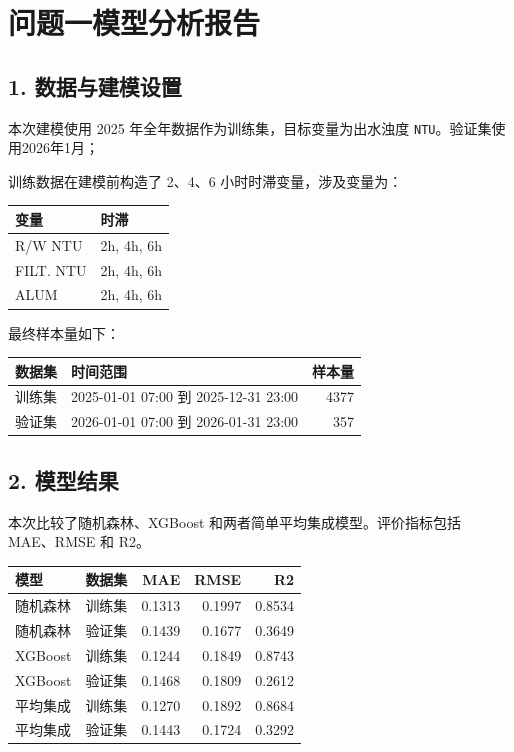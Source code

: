 \documentclass[
]{ctexart}
\author{}
\date{}
\begin{document}
\hypertarget{ux95eeux9898ux4e00ux6a21ux578bux5206ux6790ux62a5ux544a}{%
\section{问题一模型分析报告}\label{ux95eeux9898ux4e00ux6a21ux578bux5206ux6790ux62a5ux544a}}

\hypertarget{ux6570ux636eux4e0eux5efaux6a21ux8bbeux7f6e}{%
\subsection{1.
数据与建模设置}\label{ux6570ux636eux4e0eux5efaux6a21ux8bbeux7f6e}}

本次建模使用 2025 年全年数据作为训练集，目标变量为出水浊度
\texttt{NTU}。验证集使用2026年1月；

训练数据在建模前构造了 2、4、6 小时时滞变量，涉及变量为：

\begin{longtable}[]{@{}ll@{}}
\toprule
变量 & 时滞 \\
\midrule
\endhead
R/W NTU & 2h, 4h, 6h \\
FILT. NTU & 2h, 4h, 6h \\
ALUM & 2h, 4h, 6h \\
\bottomrule
\end{longtable}

最终样本量如下：

\begin{longtable}[]{@{}llr@{}}
\toprule
数据集 & 时间范围 & 样本量 \\
\midrule
\endhead
训练集 & 2025-01-01 07:00 到 2025-12-31 23:00 & 4377 \\
验证集 & 2026-01-01 07:00 到 2026-01-31 23:00 & 357 \\
\bottomrule
\end{longtable}

\hypertarget{ux6a21ux578bux7ed3ux679c}{%
\subsection{2. 模型结果}\label{ux6a21ux578bux7ed3ux679c}}

本次比较了随机森林、XGBoost 和两者简单平均集成模型。评价指标包括
MAE、RMSE 和 R2。

\begin{longtable}[]{@{}llrrr@{}}
\toprule
模型 & 数据集 & MAE & RMSE & R2 \\
\midrule
\endhead
随机森林 & 训练集 & 0.1313 & 0.1997 & 0.8534 \\
随机森林 & 验证集 & 0.1439 & 0.1677 & 0.3649 \\
XGBoost & 训练集 & 0.1244 & 0.1849 & 0.8743 \\
XGBoost & 验证集 & 0.1468 & 0.1809 & 0.2612 \\
平均集成 & 训练集 & 0.1270 & 0.1892 & 0.8684 \\
平均集成 & 验证集 & 0.1443 & 0.1724 & 0.3292 \\
\bottomrule
\end{longtable}
\end{document}
